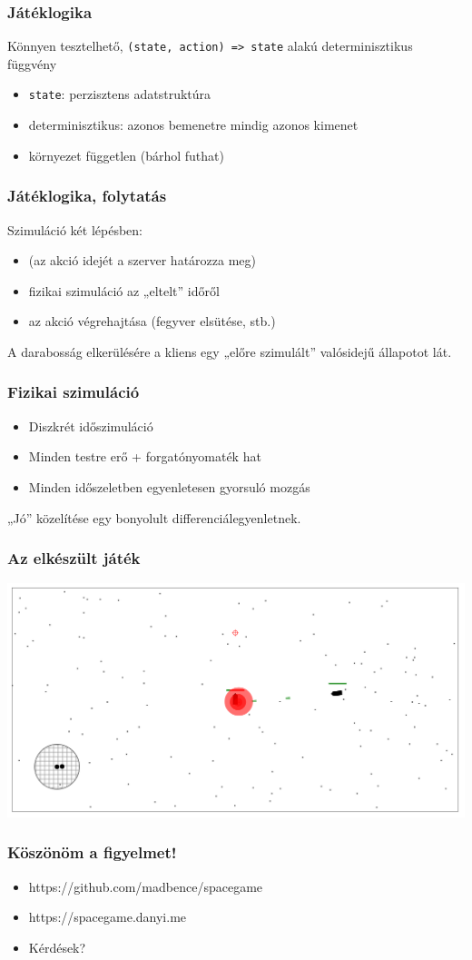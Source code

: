 \documentclass[xetex,14pt]{beamer}
\begin{document}
  \begin{frame}
    \frametitle{Játéklogika}
    Könnyen tesztelhető, \texttt{(state, action) => state} alakú determinisztikus függvény
    \begin{itemize}
      \item \texttt{state}: perzisztens adatstruktúra
      \item determinisztikus: azonos bemenetre mindig azonos kimenet
      \item környezet független (bárhol futhat)
    \end{itemize}
  \end{frame}
  \begin{frame}
    \frametitle{Játéklogika, folytatás}
    Szimuláció két lépésben:
    \begin{itemize}
      \item (az akció idejét a szerver határozza meg)
      \item fizikai szimuláció az „eltelt” időről
      \item az akció végrehajtása (fegyver elsütése, stb.)
    \end{itemize}
    \vfill
    A darabosság elkerülésére a kliens egy „előre szimulált” valósidejű állapotot lát.
  \end{frame}
  \begin{frame}
    \frametitle{Fizikai szimuláció}
    \begin{itemize}
      \item Diszkrét időszimuláció
      \item Minden testre erő + forgatónyomaték hat
      \item Minden időszeletben egyenletesen gyorsuló mozgás
    \end{itemize}
    „Jó” közelítése egy bonyolult differenciálegyenletnek.
  \end{frame}
  \begin{frame}
    \frametitle{Az elkészült játék}
    \includegraphics[width=\textwidth]{figures/screenshot}
  \end{frame}
  \begin{frame}
    \frametitle{Köszönöm a figyelmet!}
    \begin{itemize}
      \item https://github.com/madbence/spacegame
      \item https://spacegame.danyi.me
      \item Kérdések?
    \end{itemize}
  \end{frame}
\end{document}
